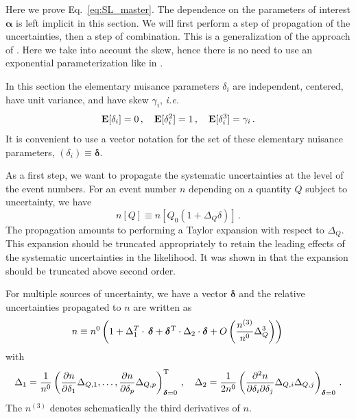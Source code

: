 \documentclass[11pt]{article}
\def\ie{{\it i.e.}}
\newcommand{\be}{\begin{equation}}
\newcommand{\ee}{\end{equation}}
\begin{document}
Here we prove Eq.~\eqref{eq:SL_master}.  The dependence on the parameters of interest $\bm{\alpha}$ is left implicit in this section. We will first perform a step of  propagation of the uncertainties, then a step of combination. This is a generalization of the approach of \cite{Fichet:2016gvx}. Here we take into account the skew, hence there is no need to use an exponential parameterization like in \cite{Fichet:2016gvx}.

In this section the elementary nuisance parameters $\delta_i$ are independent, centered, have unit variance, and have skew $\gamma_i$, \textit{i.e.}
\be
{\bf E}[\delta_i]=0\,,\quad {\bf E}[\delta_i^2]=1 \,,\quad {\bf E}[\delta_i^3]=\gamma_i\,.
\ee
It is  convenient to use a vector notation for the set of these elementary nuisance parameters, $(\delta_i)\equiv \boldsymbol{\delta} $.



As a first step, we want to propagate the systematic uncertainties at the level of the event numbers.  For an event number $n$ depending on a quantity $Q$ subject to uncertainty, we have
\be n[Q]\equiv n[Q_0(1+\Delta_Q \delta)]\,.
\ee
The propagation amounts to performing a Taylor expansion with respect to $\Delta_Q $. This expansion should be truncated appropriately  to retain the leading effects of the systematic uncertainties in the likelihood. It was shown in \cite{Fichet:2016gvx} that  the expansion should be truncated above second order.







For multiple sources of uncertainty, we have a vector $\boldsymbol{\delta}$ and the relative uncertainties propagated to $n$ are written as
\be n\equiv n^{0}\left( 1+ \Delta_{1}^T\cdot \, \boldsymbol{\delta}+\boldsymbol{\delta}^{\rm T}\cdot\Delta_{2} \cdot \boldsymbol{\delta} +O\left(\frac{n^{(3)}}{n^{0}}\Delta_Q^3\right)
\right)\,
\label{eq:propmult}
\ee
with
\be
\Delta_1=\frac{1}{n^{0}}\left(\frac{\partial n }{\partial \delta_{1}}\Delta_{Q,1},\ldots,
\frac{ \partial n }{\partial \delta_{p}}\Delta_{Q,p} \right)_{\boldsymbol{\delta}=0}^{\rm T} \,, \label{eq:stdDelta1} \quad \Delta_2=\frac{1}{2n^{0}}\left(\frac{\partial^2 n}{\partial \delta_{i}\partial \delta_{j}}\Delta_{Q,i}\Delta_{Q,j}  \right)_{\boldsymbol{\delta}=0}\,.
\ee
The $n^{(3)}$ denotes schematically the third derivatives of $n$.
\end{document}
